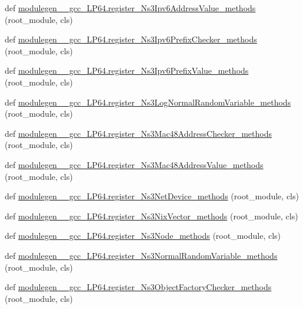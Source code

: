 \begin{DoxyCompactItemize}
\item 
def \hyperlink{namespacemodulegen____gcc__LP64_ab829e3fded47f86a33a84e69215707ca}{modulegen\+\_\+\+\_\+gcc\+\_\+\+L\+P64.\+register\+\_\+\+Ns3\+Ipv6\+Address\+Value\+\_\+methods} (root\+\_\+module, cls)
\item 
def \hyperlink{namespacemodulegen____gcc__LP64_ab45b7cad858b5fb8fd4921640270716f}{modulegen\+\_\+\+\_\+gcc\+\_\+\+L\+P64.\+register\+\_\+\+Ns3\+Ipv6\+Prefix\+Checker\+\_\+methods} (root\+\_\+module, cls)
\item 
def \hyperlink{namespacemodulegen____gcc__LP64_a24017f7931b685270f9f9cae9dbc1f2e}{modulegen\+\_\+\+\_\+gcc\+\_\+\+L\+P64.\+register\+\_\+\+Ns3\+Ipv6\+Prefix\+Value\+\_\+methods} (root\+\_\+module, cls)
\item 
def \hyperlink{namespacemodulegen____gcc__LP64_ae7aba903a40a328adf29c1a4e3b4c374}{modulegen\+\_\+\+\_\+gcc\+\_\+\+L\+P64.\+register\+\_\+\+Ns3\+Log\+Normal\+Random\+Variable\+\_\+methods} (root\+\_\+module, cls)
\item 
def \hyperlink{namespacemodulegen____gcc__LP64_a8b5d96f51d4bdc5d94489bcc0a50e648}{modulegen\+\_\+\+\_\+gcc\+\_\+\+L\+P64.\+register\+\_\+\+Ns3\+Mac48\+Address\+Checker\+\_\+methods} (root\+\_\+module, cls)
\item 
def \hyperlink{namespacemodulegen____gcc__LP64_aa62ae7526abc00b083df3d90589e2e92}{modulegen\+\_\+\+\_\+gcc\+\_\+\+L\+P64.\+register\+\_\+\+Ns3\+Mac48\+Address\+Value\+\_\+methods} (root\+\_\+module, cls)
\item 
def \hyperlink{namespacemodulegen____gcc__LP64_a2518a92fbd97a7666c5b4897eeb07c34}{modulegen\+\_\+\+\_\+gcc\+\_\+\+L\+P64.\+register\+\_\+\+Ns3\+Net\+Device\+\_\+methods} (root\+\_\+module, cls)
\item 
def \hyperlink{namespacemodulegen____gcc__LP64_a5cca2624411c350fed578acdd9616437}{modulegen\+\_\+\+\_\+gcc\+\_\+\+L\+P64.\+register\+\_\+\+Ns3\+Nix\+Vector\+\_\+methods} (root\+\_\+module, cls)
\item 
def \hyperlink{namespacemodulegen____gcc__LP64_a158d48a8db192c306a8eff9ae0b0503a}{modulegen\+\_\+\+\_\+gcc\+\_\+\+L\+P64.\+register\+\_\+\+Ns3\+Node\+\_\+methods} (root\+\_\+module, cls)
\item 
def \hyperlink{namespacemodulegen____gcc__LP64_aa148bd7210335689691b38939225327f}{modulegen\+\_\+\+\_\+gcc\+\_\+\+L\+P64.\+register\+\_\+\+Ns3\+Normal\+Random\+Variable\+\_\+methods} (root\+\_\+module, cls)
\item 
def \hyperlink{namespacemodulegen____gcc__LP64_a4f37eb35629332dd2318799b3efe197e}{modulegen\+\_\+\+\_\+gcc\+\_\+\+L\+P64.\+register\+\_\+\+Ns3\+Object\+Factory\+Checker\+\_\+methods} (root\+\_\+module, cls)

\end{DoxyCompactItemize}
